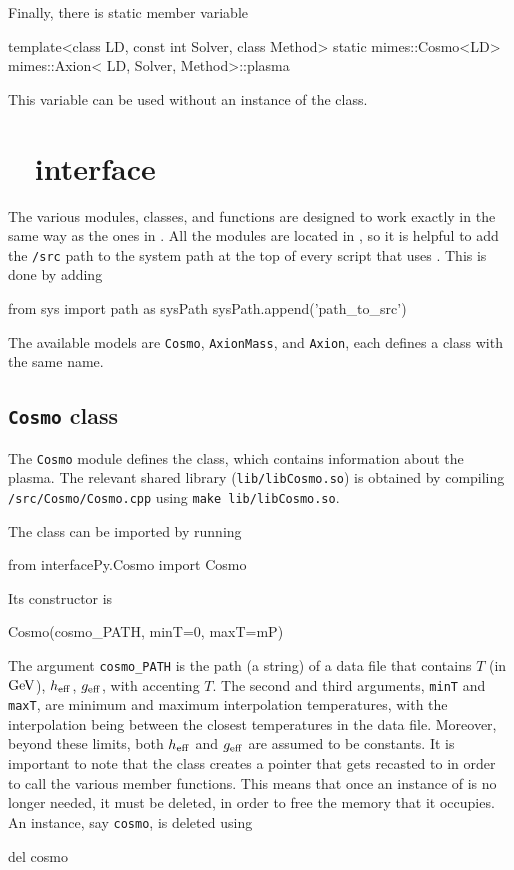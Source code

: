 \documentclass[11pt,a4paper]{article}
\begin{document}
Finally, there is static  member variable
%
\begin{cpp}
	template<class LD, const int Solver, class Method>
	static mimes::Cosmo<LD> mimes::Axion< LD, Solver, Method>::plasma
\end{cpp}
%
This variable can be used without an instance of the  class.

\section{\mimes~  \PY interface}\label{app:modules}
\setcounter{equation}{0}

The various \PY modules, classes, and functions are designed to work exactly in the same way as the ones in \CPP. All the modules are located in , so it is helpful to add the {\tt \mimes/src} path to the system path at the top of every script that uses \mimes. This is done by adding
%
\begin{py}
	from sys import path as sysPath
	sysPath.append('path_to_src')
\end{py}

The available models are {\tt Cosmo}, {\tt AxionMass}, and {\tt Axion}, each defines a class with the same name.

\subsection{{\tt Cosmo} class}
%
The {\tt Cosmo} module defines the  class, which contains information about the plasma. The relevant shared library ({\tt lib/libCosmo.so}) is obtained by compiling {\tt \mimes/src/Cosmo/Cosmo.cpp} using {\tt make lib/libCosmo.so}.
%

The class can be imported by running 
%
\begin{py}
	from interfacePy.Cosmo import Cosmo
\end{py}
%
Its constructor is
%
\begin{py}
	Cosmo(cosmo_PATH, minT=0, maxT=mP)
\end{py}
%
The argument {\tt cosmo\_PATH} is the path (a string) of a data file that contains $T$ (in ${\rm GeV}$), $h_{\rm eff}{}$, $g_{\rm eff}{}$, with accenting $T$. The second and third arguments, {\tt minT} and {\tt maxT}, are minimum and maximum interpolation temperatures, with the interpolation being between the closest temperatures in the data file. Moreover, beyond these limits, both $h_{\rm eff}{}$ and $g_{\rm eff}{}$ are assumed to be constants. It is important to note that the class creates a  pointer that gets recasted to  in order to call the various member functions. This means that once an instance of  is no longer needed, it must be deleted, in order to free the memory that it occupies. An instance, say {\tt cosmo}, is deleted using
%
\begin{py}
	del cosmo
\end{py}
\end{document}
